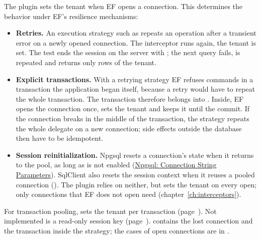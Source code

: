 The plugin sets the tenant when EF opens a connection. This determines the behavior under EF's
resilience mechanisms:

\begin{itemize}
  \item \textbf{Retries.} An execution strategy such as
     repeats an operation after
    a transient error on a newly opened connection. The interceptor runs again, the tenant is set.
    The test ends the session on the server with ;
    the next query fails, is repeated and returns only rows of the tenant.
  \item \textbf{Explicit transactions.} With a retrying strategy EF refuses commands in a
    transaction the application began itself, because a retry would have to repeat the whole
    transaction. The transaction therefore belongs into
    .
    Inside, EF opens the connection once, sets the tenant and keeps it until the commit. If the
    connection breaks in the middle of the transaction, the strategy repeats the whole delegate on
    a new connection; side effects outside the database then have to be idempotent.
  \item \textbf{Session reinitialization.} Npgsql resets a connection's state when it returns to
    the pool, as long as  is not enabled
    (\href{https://www.npgsql.org/doc/connection-string-parameters.html}{Npgsql: Connection String Parameters}).
    SqlClient also resets the session context when it reuses a pooled connection
    (). The plugin relies
    on neither, but sets the tenant on every open; only connections that EF does not open need
     (chapter~\ref{ch:interceptors}).
\end{itemize}

For transaction pooling, 
sets the tenant per transaction (page~\pageref{sec:transaction-pooling}). Not implemented is a
read-only session key (page~\pageref{sec:threat-model}).  contains the lost connection and
the transaction inside the strategy; the cases of open connections are in
.


